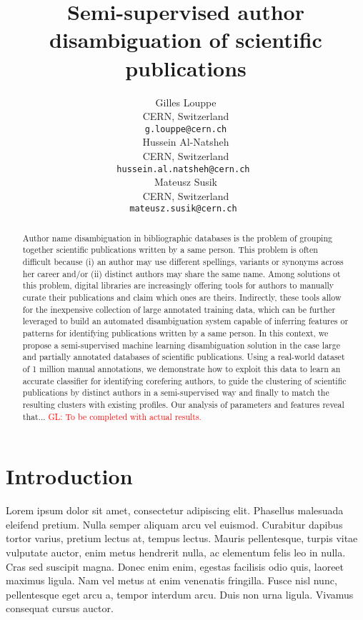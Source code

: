 \documentclass{article}
\title{Semi-supervised author disambiguation of scientific publications}
\author{Gilles Louppe\\
        CERN, Switzerland\\
        \texttt{g.louppe@cern.ch}\\
\And Hussein Al-Natsheh\\
        CERN, Switzerland\\
        \texttt{hussein.al.natsheh@cern.ch }\\
\And Mateusz Susik\\
        CERN, Switzerland\\
        \texttt{mateusz.susik@cern.ch }\\ }
\date{}
\newcommand{\glnote}[1]{\textcolor{red}{GL: #1}}
\begin{document}
\maketitle

\begin{abstract}

Author name disambiguation in bibliographic databases is the problem of
grouping together scientific publications written by a same person. This
problem is often difficult because (i) an author may use different spellings,
variants or synonyms across her career and/or (ii) distinct authors may share
the same name. Among solutions ot this problem, digital libraries are
increasingly offering tools for authors to manually curate their publications
and claim which ones are theirs. Indirectly, these tools allow for the
inexpensive collection of large annotated training data, which can be further
leveraged to build an automated disambiguation system capable of inferring
features or patterns for identifying publications written by a same person.  In
this context, we propose a semi-supervised machine learning disambiguation
solution in the case large and partially annotated databases of scientific
publications. Using a real-world dataset of 1 million manual annotations, we
demonstrate how to exploit this data to learn an accurate classifier for
identifying corefering authors, to guide the clustering of scientific
publications by distinct authors in a semi-supervised way and finally to match
the resulting clusters with existing profiles.  Our analysis of parameters and
features reveal that... \glnote{To be completed with actual results.}

\end{abstract}



\section{Introduction}
\label{introduction}


Lorem ipsum dolor sit amet, consectetur adipiscing elit. Phasellus malesuada
eleifend pretium. Nulla semper aliquam arcu vel euismod. Curabitur dapibus
tortor varius, pretium lectus at, tempus lectus. Mauris pellentesque, turpis
vitae vulputate auctor, enim metus hendrerit nulla, ac elementum felis leo in
nulla. Cras sed suscipit magna. Donec enim enim, egestas facilisis odio quis,
laoreet maximus ligula. Nam vel metus at enim venenatis fringilla. Fusce nisl
nunc, pellentesque eget arcu a, tempor interdum arcu. Duis non urna ligula.
Vivamus consequat cursus auctor.
\end{document}
